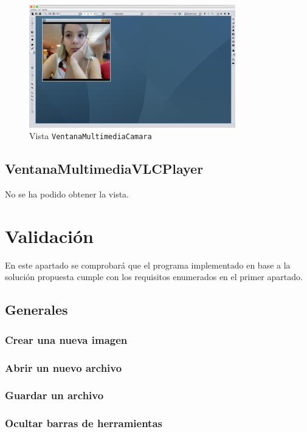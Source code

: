 \vskip0.3cm
\begin{figure}[H]
 \centering
  \includegraphics[width=0.8\textwidth]{video/webcam.jpg}
 \caption{Vista \texttt{VentanaMultimediaCamara}}
 \label{diseño}
 \end{figure}

\subsection{VentanaMultimediaVLCPlayer} 
 No se ha podido obtener la vista.
\clearpage
\section{Validación}
En este apartado se comprobará que el programa implementado en base a la solución propuesta cumple con los requisitos enumerados en el primer apartado.
\subsection{Generales}
\subsubsection{Crear una nueva imagen}
\subsubsection{Abrir un nuevo archivo}
\subsubsection{Guardar un archivo}
\subsubsection{Ocultar barras de herramientas}
